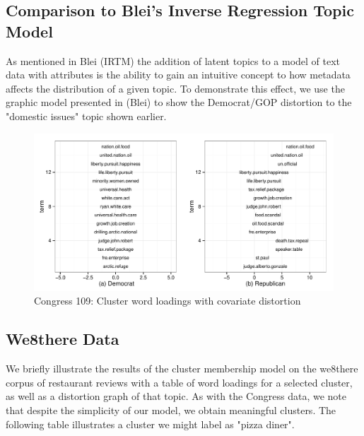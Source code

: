 \documentclass[12pt]{article}
\begin{document}
\subsection{Comparison to Blei's Inverse Regression Topic Model}
As mentioned in Blei (IRTM) the addition of latent topics to a model of text data with attributes is the ability to gain an intuitive concept to how metadata affects the distribution of a given topic. 
To demonstrate this effect, we use the graphic model presented in (Blei) to show the Democrat/GOP distortion to the "domestic issues"  topic shown earlier. 

\begin{figure}[!htpb]
  \centering
\caption[Loadings]{Congress 109: Cluster word loadings with covariate distortion}
  \includegraphics[width=6.2in]{Images/Blei_Changing_Loadings_GOP.pdf}
\end{figure}


\subsection{We8there Data}

We briefly illustrate the results of the cluster membership model on the we8there corpus of restaurant reviews with a table of word loadings for a selected cluster, as well as a distortion graph of that topic. 
As with the Congress data, we note that despite the simplicity of our model, we obtain meaningful clusters. The following table illustrates a cluster we might label as "pizza diner". 
\end{document}
